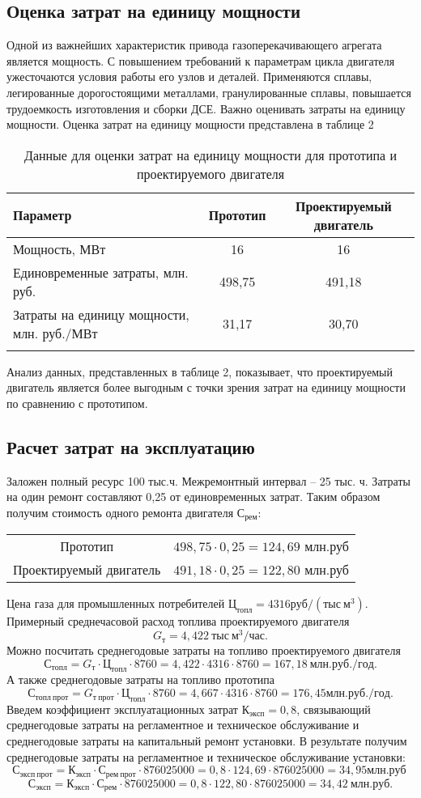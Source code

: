 \subsection{Оценка затрат на единицу мощности}
Одной из важнейших характеристик привода газоперекачивающего агрегата является мощность. С повышением требований к
параметрам цикла двигателя ужесточаются условия работы его узлов и деталей. Применяются сплавы, легированные
дорогостоящими металлами, гранулированные сплавы, повышается трудоемкость изготовления и сборки ДСЕ. Важно оценивать
затраты на единицу мощности. Оценка затрат на единицу мощности представлена в таблице 2
\begin{longtable}{|p{6cm}|c|c|}
    \hline
    \textbf{Параметр} &
    \textbf{Прототип} &
    \textbf{Проектируемый двигатель} \\\hline
    \endhead
    Мощность, МВт & 16 & 16 \\\hline
    Единовременные затраты, млн. руб. & 498,75 & 491,18 \\\hline
    Затраты на единицу мощности, млн. руб./МВт & 31,17 & 30,70 \\\hline
    \caption{Данные для оценки затрат на единицу мощности для прототипа и проектируемого двигателя} \label{tab:economics-unit-power}
\end{longtable}
Анализ данных, представленных в таблице 2, показывает, что проектируемый двигатель является более выгодным с точки зрения
затрат на единицу мощности по сравнению с прототипом.

\subsection{Расчет затрат на эксплуатацию}
Заложен полный ресурс 100 тыс.ч. Межремонтный интервал – 25 тыс. ч. Затраты на один ремонт составляют 0,25 от единовременных затрат.
Таким образом получим стоимость одного ремонта двигателя $С_{рем}$:
\begin{longtable}{c c}
    Прототип & $498,75 \cdot 0,25=124,69$ млн.руб \\
    Проектируемый двигатель & $491,18 \cdot 0,25=122,80$ млн.руб \\
\end{longtable}
Цена газа для промышленных потребителей $Ц_{топл} = 4316 руб/(тыс \ м^3)$.
Примерный среднечасовой расход топлива проектируемого двигателя
$$
G_т = 4,422 \ тыс \ м^3 / час.
$$
Можно посчитать среднегодовые затраты на топливо проектируемого двигателя
$$
С_{топл}=G_т \cdot Ц_{топл} \cdot 8760 = 4,422 \cdot 4316 \cdot 8760 = 167,18 \ млн.руб./год.
$$
А также среднегодовые затраты на топливо прототипа
$$
С_{топл \ прот} = G_{т \ прот} \cdot Ц_{топл} \cdot 8760 = 4,667 \cdot 4316 \cdot 8760 = 176,45 млн.руб./год.
$$
Введем коэффициент эксплуатационных затрат $К_{эксп} = 0,8$, связывающий среднегодовые затраты на регламентное и
техническое обслуживание и среднегодовые затраты на капитальный ремонт установки. В результате получим среднегодовые
затраты на регламентное и техническое обслуживание установки:
$$
С_{эксп \ прот} = К_{эксп} \cdot С_{рем \ прот} \cdot 876025000 = 0,8 \cdot 124,69 \cdot 876025000 = 34,95 млн.руб \
$$
$$
С_{эксп} = К_{эксп} \cdot С_{рем} \cdot 876025000 = 0,8 \cdot 122,80 \cdot 876025000 = 34,42 \ млн.руб.
$$

